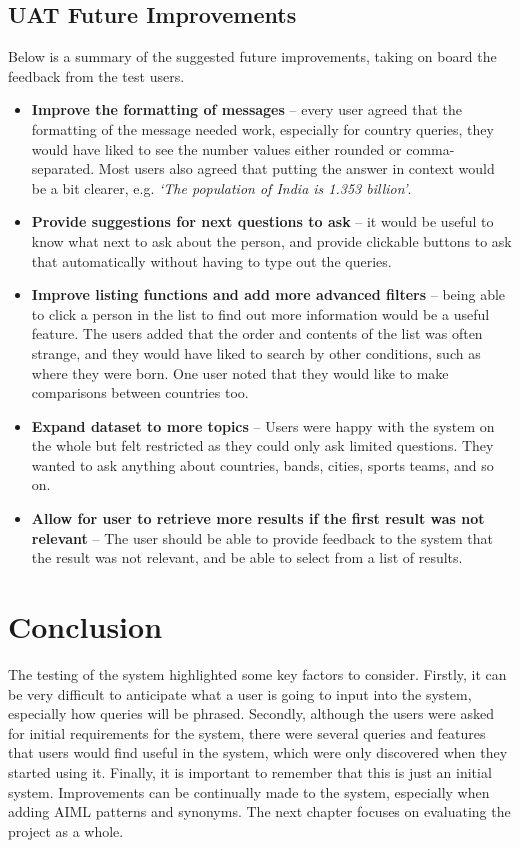 \subsection{UAT Future Improvements}
Below is a summary of the suggested future improvements, taking on board the feedback from the test users.
\begin{itemize}
	\item \textbf{Improve the formatting of messages} -- every user agreed that the formatting of the message needed work, especially for country queries, they would have liked to see the number values either rounded or comma-separated. Most users also agreed that putting the answer in context would be a bit clearer, e.g. {\it `The population of India is 1.353 billion'}.
	\item \textbf{Provide suggestions for next questions to ask} -- it would be useful to know what next to ask about the person, and provide clickable buttons to ask that automatically without having to type out the queries.
	\item \textbf{Improve listing functions and add more advanced filters} -- being able to click a person in the list to find out more information would be a useful feature. The users added that the order and contents of the list was often strange, and they would have liked to search by other conditions, such as where they were born. One user noted that they would like to make comparisons between countries too.
	\item \textbf{Expand dataset to more topics} -- Users were happy with the system on the whole but felt restricted as they could only ask limited questions. They wanted to ask anything about countries, bands, cities, sports teams, and so on.
	\item \textbf{Allow for user to retrieve more results if the first result was not relevant} -- The user should be able to provide feedback to the system that the result was not relevant, and be able to select from a list of results.
\end{itemize}

\section{Conclusion}
The testing of the system highlighted some key factors to consider. Firstly, it can be very difficult to anticipate what a user is going to input into the system, especially how queries will be phrased. Secondly, although the users were asked for initial requirements for the system, there were several queries and features that users would find useful in the system, which were only discovered when they started using it. Finally, it is important to remember that this is just an initial system. Improvements can be continually made to the system, especially when adding AIML patterns and synonyms. The next chapter focuses on evaluating the project as a whole. 